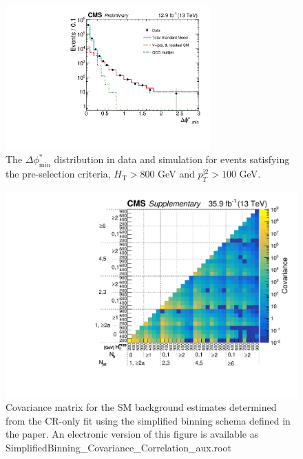 \begin{figure}[p]
    \caption{ 
    The $\Delta\phi^{*}_{\mathrm{min}}$ distribution in data and simulation for events
	satisfying the pre-selection criteria, $H_{\mathrm{T}} > 800$ GeV and
	$p_{T}^{\mathrm{j2}} > 100$ GeV. 
    \label{fig:bDPhi} }
  \begin{center}
  \includegraphics[width=0.7\textwidth]{Supplementary/bDPhi_aux}
  \end{center}
\end{figure}


\clearpage
\begin{figure}
  \centering
  \includegraphics[width=\textwidth]{Supplementary/SimplifiedBinning_Covariance_aux}
  \caption{Covariance matrix for the SM background estimates
    determined from the CR-only fit using the simplified binning
	schema defined in the paper.
	An electronic version of this figure is available as SimplifiedBinning\_Covariance\_Correlation\_aux.root
	} %
  \label{fig:covariance_aux}
\end{figure} 
\clearpage

